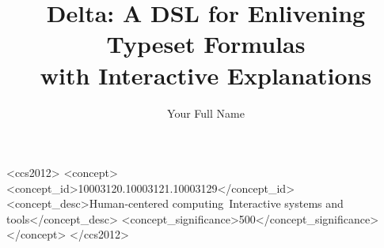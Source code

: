 \documentclass[sigconf,review,anonymous]{acmart}
\begin{document}
\title[Short title]{Delta: A DSL for Enlivening Typeset Formulas \\ with Interactive Explanations}



\begin{abstract}

\end{abstract}



\author{Your Full Name}

\renewcommand{\shortauthors}{Your last name et al.}

\begin{CCSXML}
<ccs2012>
   <concept>
       <concept_id>10003120.10003121.10003129</concept_id>
       <concept_desc>Human-centered computing~Interactive systems and tools</concept_desc>
       <concept_significance>500</concept_significance>
       </concept>
 </ccs2012>
\end{CCSXML}


\end{document}
